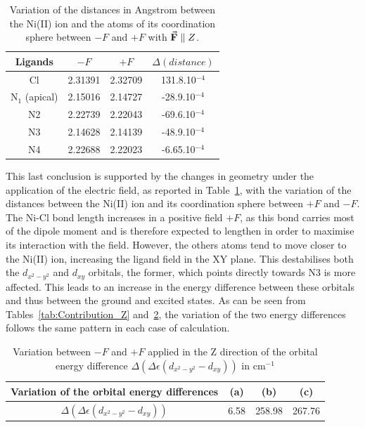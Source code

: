 \documentclass[12pt,a4paper]{report}
\numberwithin{equation}{section}
\begin{document}
\begin{table}[!ht]
    \centering
    \begin{tabular}{| c | c| c | c |}
        \hline
        Ligands & $-F$ & $+F$ &$\Delta(distance)$\\
        \hline
        Cl & 2.31391& 2.32709&  131.8.10$^{-4}$\\
        N$_1$ (apical) & 2.15016  & 2.14727 &-28.9.10$^{-4}$\\
        N2 & 2.22739 & 2.22043&-69.6.10$^{-4}$ \\
        N3 & 2.14628& 2.14139&-48.9.10$^{-4}$ \\
        N4 & 2.22688 & 2.22023 &-6.65.10$^{-4}$\\
        \hline
    \end{tabular}
    \caption{Variation of the distances in Angstrom between the Ni(II) ion and the atoms of its coordination sphere between $-F$ and $+F$ with $\vec{\vb{F}}\parallel Z$.}
    \label{tab:DistanceZ}
\end{table}
This last conclusion is supported by the changes in geometry under the application of the electric field, as reported in Table~\ref{tab:DistanceZ}, with the variation of the distances between the Ni(II) ion and its coordination sphere between $+F$ and $-F$.
The Ni-Cl bond length increases in a positive field $+F$, as this bond carries most of the dipole moment and is therefore expected to lengthen in order to maximise its interaction with the field. 
However, the others atoms tend to move closer to the Ni(II) ion, increasing the ligand field in the XY plane. 
This destabilises both the $d_{x^2-y^2}$ and $d_{xy}$ orbitals, the former, which points directly towards N3 is more affected.
This leads to an increase in the energy difference between these orbitals and thus between the ground and excited states.
As can be seen from Tables~\ref{tab:Contribution_Z} and~\ref{tab:EOrbitaleZ}, the variation of the two energy differences follows the same pattern in each case of calculation.

\begin{table}[h]
    \centering
    \begin{tabular}{|c | c c c |}
        \hline
        Variation of the orbital energy differences & (a) & (b) & (c)\\
        \hline
        $\Delta(\Delta \epsilon (d_{x^2-y^2}-d_{xy}))$& 6.58 & 258.98 & 267.76\\
        \hline
    \end{tabular}
    \caption{Variation between $-F$ and $+F$ applied in the Z direction of the orbital energy difference $\Delta(\Delta \epsilon (d_{x^2-y^2}-d_{xy}))$ in cm$^{-1}$}
    \label{tab:EOrbitaleZ}
\end{table}
\end{document}
